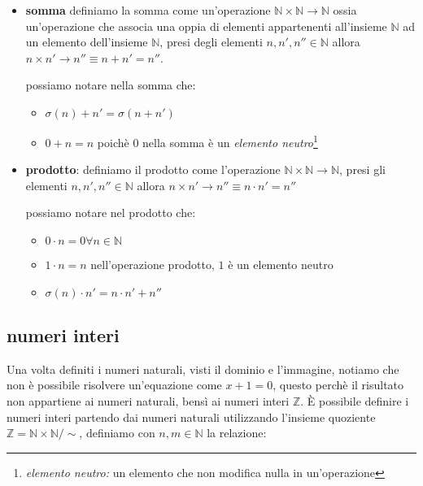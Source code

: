 \documentclass{article}
\begin{document}
        \begin{itemize}
            
            \item\textbf{somma}
            definiamo la somma come un'operazione $\mathbb{N} \times \mathbb{N}\rightarrow \mathbb{N}$ ossia un'operazione che associa una oppia di elementi appartenenti all'insieme $\mathbb{N}$ ad un elemento dell'insieme $\mathbb{N}$, presi degli elementi $n,n',n''\in \mathbb{N}$ allora $n\times n'\rightarrow n''\equiv n+n'=n''$.

            possiamo notare nella somma che:
            \begin{itemize}
                \item $\sigma(n)+n'=\sigma(n+n')$
                \item $0+n=n$ poichè $0$ nella somma è un \textit{elemento neutro}\footnote{\textit{elemento neutro:} un elemento che non modifica nulla in un'operazione}
            \end{itemize}

            \item \textbf{prodotto}:
            definiamo il prodotto come l'operazione $\mathbb{N}\times \mathbb{N} \rightarrow \mathbb{N}$, presi gli elementi $n,n',n''\in \mathbb{N}$ allora $n\times n'\rightarrow n'' \equiv n\cdot n'=n''$

            possiamo notare nel prodotto che:
            \begin{itemize}
                \item $0\cdot n= 0 \forall n\in \mathbb{N}$
                \item $1\cdot n=n$ nell'operazione prodotto, $1$ è un elemento neutro
                \item $\sigma(n)\cdot n'= n\cdot n' + n''$ 
            \end{itemize}
        \end{itemize}
    \subsection{numeri interi}
        Una volta definiti i numeri naturali, visti il dominio e l'immagine, notiamo che non è possibile risolvere un'equazione come $x+1=0$, questo perchè il risultato non appartiene ai numeri naturali, bensì ai numeri interi $\mathbb{Z}$.
        È possibile definire i numeri interi partendo dai numeri naturali utilizzando l'insieme quoziente $\mathbb{Z}=\mathbb{N}\times \mathbb{N} /\sim$, definiamo con $n,m \in \mathbb{N}$ la relazione:
\end{document}
